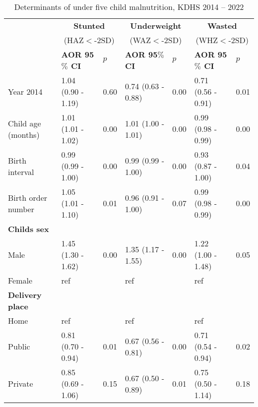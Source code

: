 \documentclass[sn-basic,Numbered,pdflatex]{sn-jnl}
\theoremstyle{remark}
\theoremstyle{definition}
\begin{document}
\renewcommand{\arraystretch}{0.8}
\begin{table}[!h]

\caption{\label{tab:four}Determinants of under five child malnutrition, KDHS 2014 -- 2022}
\centering
\begin{tabular}[t]{lllllll}
\toprule
\multicolumn{1}{c}{\textbf{ }} & \multicolumn{2}{c}{\textbf{Stunted}} & \multicolumn{2}{c}{\textbf{Underweight}} & \multicolumn{2}{c}{\textbf{Wasted}} \\
\multicolumn{1}{c}{ } & \multicolumn{2}{c}{(HAZ$<$-2SD)} & \multicolumn{2}{c}{(WAZ$<$-2SD)} & \multicolumn{2}{c}{(WHZ$<$-2SD)} \\
\cmidrule(l{0pt}r{0pt}){2-3} \cmidrule(l{0pt}r{0pt}){4-5} \cmidrule(l{0pt}r{0pt}){6-7}
\textbf{ } & \textbf{AOR 95$\%$ CI} & \textbf{$p$} & \textbf{AOR 95$\%$ CI} & \textbf{$p$} & \textbf{AOR 95$\%$ CI} & \textbf{$p$}\\
\midrule
Year 2014 & 1.04 (0.90 - 1.19) & 0.60 & 0.74 (0.63 - 0.88) & 0.00 & 0.71 (0.56 - 0.91) & 0.01\\
Child age (months) & 1.01 (1.01 - 1.02) & 0.00 & 1.01 (1.00 - 1.01) & 0.00 & 0.99 (0.98 - 0.99) & 0.00\\
Birth interval & 0.99 (0.99 - 1.00) & 0.00 & 0.99 (0.99 - 1.00) & 0.00 & 0.93 (0.87 - 1.00) & 0.04\\
Birth order number & 1.05 (1.01 - 1.10) & 0.01 & 0.96 (0.91 - 1.00) & 0.07 & 0.99 (0.98 - 0.99) & 0.00\\
\textbf{Childs sex} & \textbf{} & \textbf{} & \textbf{} & \textbf{} & \textbf{} & \textbf{}\\
\addlinespace
\hspace{1em}Male & 1.45 (1.30 - 1.62) & 0.00 & 1.35 (1.17 - 1.55) & 0.00 & 1.22 (1.00 - 1.48) & 0.05\\
\hspace{1em}Female & ref &  & ref &  & ref & \\
\textbf{Delivery place} & \textbf{} & \textbf{} & \textbf{} & \textbf{} & \textbf{} & \textbf{}\\
\hspace{1em}Home & ref &  & ref &  & ref & \\
\hspace{1em}Public & 0.81 (0.70 - 0.94) & 0.01 & 0.67 (0.56 - 0.81) & 0.00 & 0.71 (0.54 - 0.94) & 0.02\\
\addlinespace
\hspace{1em}Private & 0.85 (0.69 - 1.06) & 0.15 & 0.67 (0.50 - 0.89) & 0.01 & 0.75 (0.50 - 1.14) & 0.18\\

\end{tabular}
\end{table}
\end{document}
